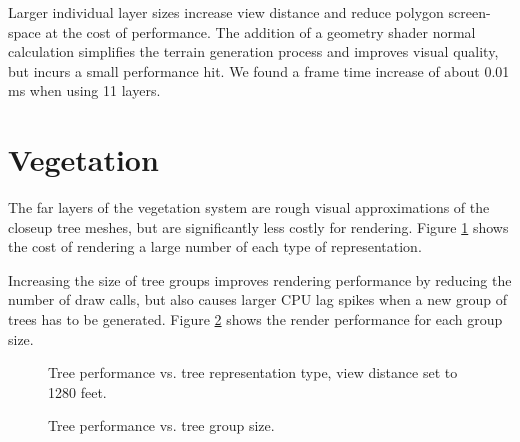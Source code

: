 Larger individual layer sizes increase view distance and reduce polygon screen-space at the cost of performance.
The addition of a geometry shader normal calculation simplifies the terrain generation process and improves visual quality, but incurs a small performance hit.
We found a frame time increase of about 0.01 ms when using 11 layers.


\section{Vegetation}

The far layers of the vegetation system are rough visual approximations of the closeup tree meshes, but are significantly less costly for rendering.
Figure \ref{fig:tree_plot_1} shows the cost of rendering a large number of each type of representation.

Increasing the size of tree groups improves rendering performance by reducing the number of draw calls, but also causes larger CPU lag spikes when a new group of trees has to be generated.
Figure \ref{fig:tree_plot_2} shows the render performance for each group size.

\begin{figure}
	\centering
{}
	\caption{
		Tree performance vs. tree representation type, view distance set to 1280 feet.
	}
	\label{fig:tree_plot_1}
\end{figure}

\begin{figure}
	\centering
{}
	\caption{
		Tree performance vs. tree group size.
	}
	\label{fig:tree_plot_2}
\end{figure}
